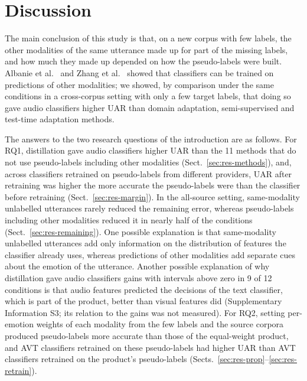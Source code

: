 \FloatBarrier
\section{Discussion}\label{sec:discussion}

The main conclusion of this study is that, on a new corpus with few labels, the other modalities of the same utterance made up for part of the missing labels, and how much they made up depended on how the pseudo-labels were built. Albanie et al.\ \cite{albanie2018} and Zhang et al.\ \cite{zhang2021combining} showed that classifiers can be trained on predictions of other modalities; we showed, by comparison under the same conditions in a cross-corpus setting with only a few target labels, that doing so gave audio classifiers higher UAR than domain adaptation, semi-supervised and test-time adaptation methods.

The answers to the two research questions of the introduction are as follows. For RQ1, distillation gave audio classifiers higher UAR than the 11 methods that do not use pseudo-labels including other modalities (Sect.~\ref{sec:res-methods}), and, across classifiers retrained on pseudo-labels from different providers, UAR after retraining was higher the more accurate the pseudo-labels were than the classifier before retraining (Sect.~\ref{sec:res-margin}). In the all-source setting, same-modality unlabelled utterances rarely reduced the remaining error, whereas pseudo-labels including other modalities reduced it in nearly half of the conditions (Sect.~\ref{sec:res-remaining}). One possible explanation is that same-modality unlabelled utterances add only information on the distribution of features the classifier already uses, whereas predictions of other modalities add separate cues about the emotion of the utterance. Another possible explanation of why distillation gave audio classifiers gains with intervals above zero in 9 of 12 conditions is that audio features predicted the decisions of the text classifier, which is part of the product, better than visual features did (Supplementary Information S3; its relation to the gains was not measured). For RQ2, setting per-emotion weights of each modality from the few labels and the source corpora produced pseudo-labels more accurate than those of the equal-weight product, and AVT classifiers retrained on these pseudo-labels had higher UAR than AVT classifiers retrained on the product's pseudo-labels (Sects.~\ref{sec:res-prop}--\ref{sec:res-retrain}).


